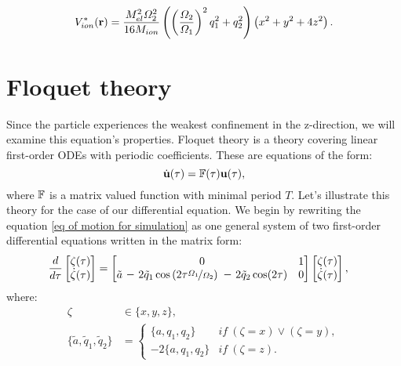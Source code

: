 \begin{equation}
	\label{ion pseudopotential}
	V_{ion}^*(\vb{r}) = \frac{M_{el}^2 \Omega_2^2}{16 M_{ion}} \left( \left(\frac{\Omega_2}{\Omega_1}\right)^2 q_1^2 + q_2^2 \right) \left(x^2 + y^2 + 4z^2\right).
\end{equation}
 

\section{Floquet theory}
\label{sec:floquet theory}
Since the particle experiences the weakest confinement in the z-direction, we will examine this equation's properties. Floquet theory is a theory covering linear first-order ODEs with periodic coefficients. These are equations of the form:
\begin{equation}
	\label{Floquet structure}
	\dot{\vb{u}}(\tau) = \mathbb{F}(\tau) \vb{u}(\tau),
\end{equation}
where $\mathbb{F}$ is a matrix valued function with minimal period $T$. Let's illustrate this theory for the case of our differential equation. We begin by rewriting the equation \eqref{eq of motion for simulation} as one general system of two first-order differential equations written in the matrix form:
\begin{align}
\label{matrix mathieu}
	\frac{d}{d \tau}
	\begin{bmatrix}
		\zeta(\tau) \\
		\dot{\zeta}(\tau)
	\end{bmatrix}	
	&=
	\begin{bmatrix}
		0 & 1 \\
		\tilde{a} \minus 2 \tilde{q}_1 \cos\left(2 \tau \nicefrac{\Omega_1}{\Omega_2} \right) \minus 2 \tilde{q}_2 \cos(2\tau) & 0	
	\end{bmatrix}
	\begin{bmatrix}
		\zeta(\tau) \\
		\dot{\zeta}(\tau)
	\end{bmatrix},
\end{align}
where:
\begin{align}
	\label{xi variable}
	\zeta &\in \{x,y,z\}, \\
	\label{tilde params} 
	\{ \tilde{a}, \tilde{q}_1, \tilde{q}_2 \} &= \begin{cases}
		\{a, q_1, q_2\} &if \ (\zeta = x) \lor (\zeta = y), \\
		\minus 2 \{a, q_1, q_2\} &if \ (\zeta = z). 
	\end{cases}
\end{align}
